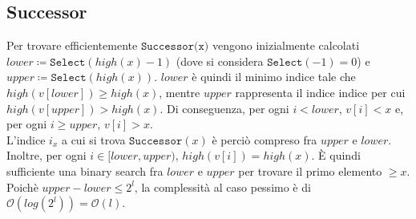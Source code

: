 \documentclass{article}
\newcommand{\ttt}{\texttt}
\newcommand*{\OO}{\ensuremath{\mathcal{O}}}
\begin{document}
\subsection{Successor}
Per trovare efficientemente $\ttt{Successor(x)}$ vengono inizialmente calcolati $lower \coloneq \ttt{Select}(high(x) - 1)$ (dove si considera $\ttt{Select}(-1) = 0$) e $upper \coloneq \ttt{Select}(high(x))$.
$lower$ \`e quindi il minimo indice tale che $high(v[lower]) \ge high(x)$, mentre $upper$ rappresenta il indice indice per cui $high(v[upper]) > high(x)$. Di conseguenza, per ogni $i < lower$, $v[i] < x$ e, per ogni $i \ge upper$, $v[i] > x$.\\
L'indice $i_x$ a cui si trova $\ttt{Successor}(x)$ \`e perci\`o compreso fra $upper$ e $lower$. Inoltre, per ogni $i \in [lower, upper)$, $high(v[i]) = high(x)$.
\`E quindi sufficiente una binary search fra $lower$ e $upper$ per trovare il primo elemento $\ge x$.\\
Poich\`e $upper - lower \le 2^l$, la complessit\`a al caso pessimo \`e di $\OO(log (2^l)) = \OO(l)$.
\end{document}

